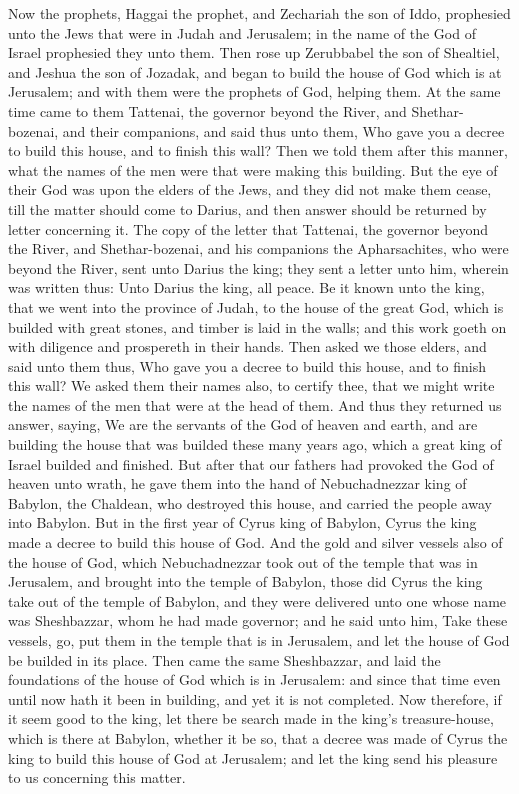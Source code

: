 Now the prophets, Haggai the prophet, and Zechariah the son of Iddo, prophesied unto the Jews that were in Judah and Jerusalem; in the name of the God of Israel prophesied they unto them. Then rose up Zerubbabel the son of Shealtiel, and Jeshua the son of Jozadak, and began to build the house of God which is at Jerusalem; and with them were the prophets of God, helping them. At the same time came to them Tattenai, the governor beyond the River, and Shethar-bozenai, and their companions, and said thus unto them, Who gave you a decree to build this house, and to finish this wall? Then we told them after this manner, what the names of the men were that were making this building. But the eye of their God was upon the elders of the Jews, and they did not make them cease, till the matter should come to Darius, and then answer should be returned by letter concerning it.  The copy of the letter that Tattenai, the governor beyond the River, and Shethar-bozenai, and his companions the Apharsachites, who were beyond the River, sent unto Darius the king; they sent a letter unto him, wherein was written thus: Unto Darius the king, all peace. Be it known unto the king, that we went into the province of Judah, to the house of the great God, which is builded with great stones, and timber is laid in the walls; and this work goeth on with diligence and prospereth in their hands. Then asked we those elders, and said unto them thus, Who gave you a decree to build this house, and to finish this wall? We asked them their names also, to certify thee, that we might write the names of the men that were at the head of them. And thus they returned us answer, saying, We are the servants of the God of heaven and earth, and are building the house that was builded these many years ago, which a great king of Israel builded and finished. But after that our fathers had provoked the God of heaven unto wrath, he gave them into the hand of Nebuchadnezzar king of Babylon, the Chaldean, who destroyed this house, and carried the people away into Babylon. But in the first year of Cyrus king of Babylon, Cyrus the king made a decree to build this house of God. And the gold and silver vessels also of the house of God, which Nebuchadnezzar took out of the temple that was in Jerusalem, and brought into the temple of Babylon, those did Cyrus the king take out of the temple of Babylon, and they were delivered unto one whose name was Sheshbazzar, whom he had made governor; and he said unto him, Take these vessels, go, put them in the temple that is in Jerusalem, and let the house of God be builded in its place. Then came the same Sheshbazzar, and laid the foundations of the house of God which is in Jerusalem: and since that time even until now hath it been in building, and yet it is not completed. Now therefore, if it seem good to the king, let there be search made in the king’s treasure-house, which is there at Babylon, whether it be so, that a decree was made of Cyrus the king to build this house of God at Jerusalem; and let the king send his pleasure to us concerning this matter. 


